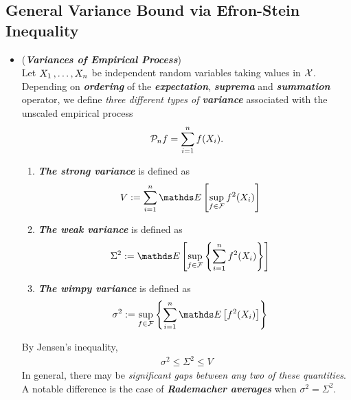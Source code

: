 \documentclass[11pt]{article}
\begin{document}
\subsection{General Variance Bound via Efron-Stein Inequality }
\begin{itemize}
\item \begin{definition}(\textbf{\emph{Variances of Empirical Process}})\\
Let $X_1 \,{,}\ldots{,}\, X_n$ be independent random variables taking values in ${\mathcal X}$.  Depending on \emph{\textbf{ordering}} of the \emph{\textbf{expectation}}, \emph{\textbf{suprema}} and \emph{\textbf{summation}} operator, we define \emph{three different types of \textbf{variance}} associated with the unscaled empirical process
\begin{align*}
{\mathcal P}_n f  =  \sum_{i=1}^n f(X_i).
\end{align*}
\begin{enumerate}
\item \emph{\textbf{The strong variance}} is defined as
\begin{align}
V &:= \sum_{i=1}^n \E{}{\sup_{f\in \cF}f^2(X_i)}  \label{def: strong_variance_emp_process}
\end{align}
\item  \emph{\textbf{The weak variance}} is defined as
\begin{align}
\Sigma^2 &:= \E{}{\sup_{f \in \cF}\set{\sum_{i=1}^{n}f^2(X_i)}}  \label{def: weak_variance_emp_process}
\end{align}
\item  \emph{\textbf{The wimpy variance}} is defined as
\begin{align}
\sigma^2 &:= \sup_{f\in \cF}\set{\sum_{i=1}^n \E{}{f^2(X_i)}} \label{def: wimpy_variance_emp_process}
\end{align}
\end{enumerate} 
By Jensen's inequality, 
\begin{align*}
\sigma^2 \le \Sigma^2 \le V
\end{align*} In general, there may be \emph{significant gaps between any two of these quantities}. A notable difference is the case of \emph{\textbf{Rademacher averages}} when $\sigma^2 = \Sigma^2$.
\end{definition}


\end{itemize}
\end{document}
